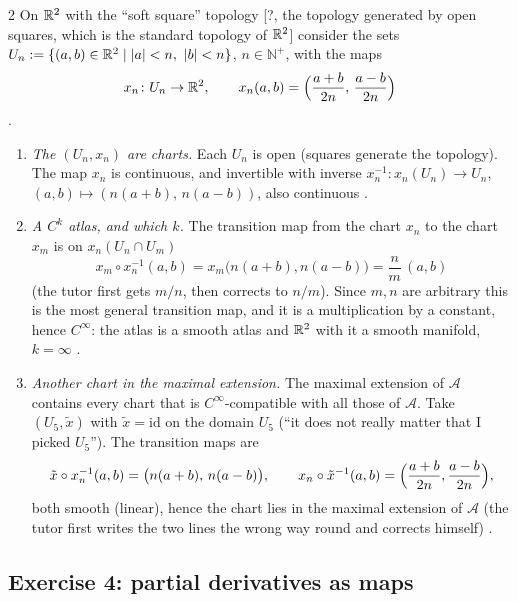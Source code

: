 \begin{paracol}{2}
On $\mathbb{R}^2$ with the ``soft square'' topology [?, the topology generated by open squares, which is the standard topology of $\mathbb{R}^2$] consider the sets $U_n:=\{(a,b)\in\R^2\mid|a|<n,\ |b|<n\}$, $n\in\mathbb N^+$, with the maps
\[
  x_n\colon U_n\to\mathbb{R}^2,\qquad x_n(a,b)=\Bigl(\frac{a+b}{2n},\,\frac{a-b}{2n}\Bigr)
\]
.
\begin{enumerate}
  \item \emph{The $(U_n,x_n)$ are charts.} Each $U_n$ is open (squares generate the topology). The map $x_n$ is continuous, and invertible with inverse $x_n^{-1}\colon x_n(U_n)\to U_n$, $(a,b)\mapsto(n(a+b),\,n(a-b))$, also continuous .
  \item \emph{A $C^k$ atlas, and which $k$.} The transition map from the chart $x_n$ to the chart $x_m$ is on $x_n(U_n\cap U_m)$
        \[
          x_m\circ x_n^{-1}(a,b)=x_m\bigl(n(a+b),n(a-b)\bigr)=\frac nm\,(a,b)
        \]
        (the tutor first gets $m/n$, then corrects to $n/m$). Since $m,n$ are arbitrary this is the most general transition map, and it is a multiplication by a constant, hence $C^\infty$: the atlas is a smooth atlas and $\mathbb{R}^2$ with it a smooth manifold, $k=\infty$
        .
  \item \emph{Another chart in the maximal extension.} The maximal extension of $\mathcal A$ contains every chart that is $C^\infty$-compatible with all those of $\mathcal A$. Take $(U_5,\tilde x)$ with $\tilde x=\mathrm{id}$ on the domain $U_5$ (``it does not really matter that I picked $U_5$'').
        The transition maps are
        \[
          \tilde x\circ x_n^{-1}(a,b)=\bigl(n(a+b),\,n(a-b)\bigr),\qquad x_n\circ\tilde x^{-1}(a,b)=\Bigl(\frac{a+b}{2n},\frac{a-b}{2n}\Bigr),
        \]
        both smooth (linear), hence the chart lies in the maximal extension of $\mathcal A$ (the tutor first writes the two lines the wrong way round and corrects himself)
        .
\end{enumerate}

\subsection*{Exercise 4: partial derivatives as maps}


\end{paracol}
